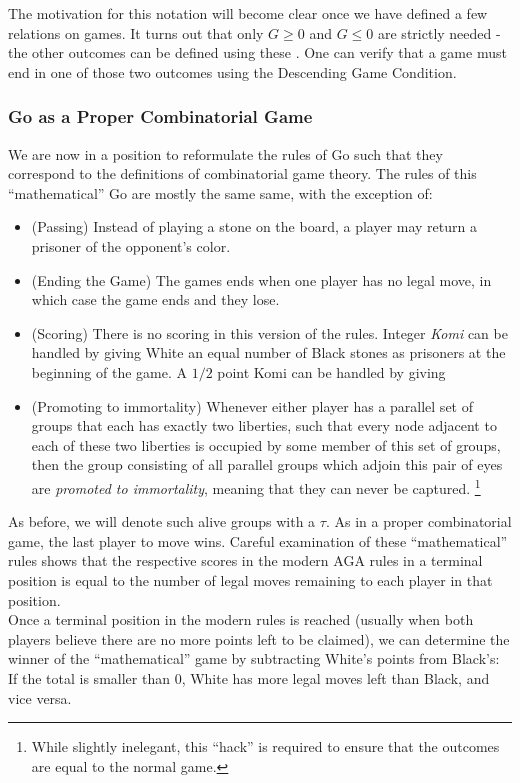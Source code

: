 \documentclass[../math194_paper.tex]{subfiles}
\begin{document}
The motivation for this notation will become clear once we have defined a few relations on games.
It turns out that only $G \geq 0$ and $G \leq 0$ are strictly needed - the other outcomes can be defined 
using these \cite[\S 2.2]{schleicher2006introduction}. One can verify that a game must end in one of those 
two outcomes using the Descending Game Condition.

\subsubsection{Go as a Proper Combinatorial Game}
We are now in a position to reformulate
the rules of Go such that they correspond to the definitions of combinatorial game
theory. The rules of this ``mathematical'' Go are mostly the same same, with the exception of:
\begin{itemize}
    \item (Passing) Instead of playing a stone on the board, a player may 
    return a prisoner of the opponent's color.
    \item (Ending the Game) The games ends when one player has no legal 
    move, in which case the game ends and they lose. 
    \item (Scoring) There is no scoring in this version of the rules. Integer \textit{Komi} 
    can be handled by giving White an equal number of Black stones as prisoners at the 
    beginning of the game. A $1/2$ point Komi can be handled by giving 
    \item (Promoting to immortality) Whenever either player has a parallel set of groups that
    each has exactly two liberties, such  that every node adjacent to each of these two
    liberties is occupied  by some member of this set of groups, then the group consisting of 
    all parallel groups which adjoin this pair of eyes are \textit{promoted to immortality}, 
    meaning that they can never be captured.  
    \footnote{While slightly inelegant, this ``hack'' is required to ensure that the 
    outcomes are equal to the normal game.}
\end{itemize}
As before, we will denote such alive groups with a $\tau$. As in a proper combinatorial game, 
the last player to move wins. Careful examination of these ``mathematical'' rules shows 
that the respective scores in the modern AGA rules in a terminal position is equal to the 
number of legal moves remaining to each player in that position. \\
Once a terminal position in the modern rules is reached (usually when both players believe
there are no more points left to be claimed), we can determine the winner of the 
``mathematical'' game by subtracting White's points from Black's: 
If the total is smaller than 0, White has more legal moves left than Black, and vice versa.
\end{document}
